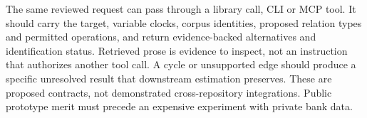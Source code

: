 The same reviewed request can pass through a library call, CLI or MCP tool. It
should carry the target, variable clocks, corpus identities, proposed relation
types and permitted operations, and return evidence-backed alternatives and
identification status. Retrieved prose is evidence to inspect, not an instruction
that authorizes another tool call. A cycle or unsupported edge should produce a
specific unresolved result that downstream estimation preserves. These are
proposed contracts, not demonstrated cross-repository integrations. Public
prototype merit must precede an expensive experiment with private bank data.
